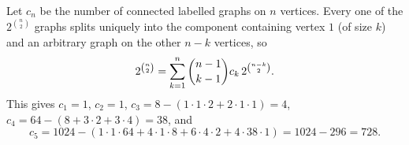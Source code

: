 Let $c_n$ be the number of connected labelled graphs on $n$ vertices. Every one of the $2^{\binom n2}$ graphs splits uniquely into the component containing vertex $1$ (of size $k$) and an arbitrary graph on the other $n-k$ vertices, so
\[
2^{\binom n2}=\sum_{k=1}^{n}\dbinom{n-1}{k-1}c_k\,2^{\binom{n-k}{2}} .
\]
This gives $c_1=1$, $c_2=1$, $c_3=8-(1\cdot1\cdot2+2\cdot1\cdot1)=4$, $c_4=64-(8+3\cdot2+3\cdot4)=38$, and
\[
c_5=1024-\left(1\cdot1\cdot64+4\cdot1\cdot8+6\cdot4\cdot2+4\cdot38\cdot1\right)=1024-296=\boxed{728}.
\]
